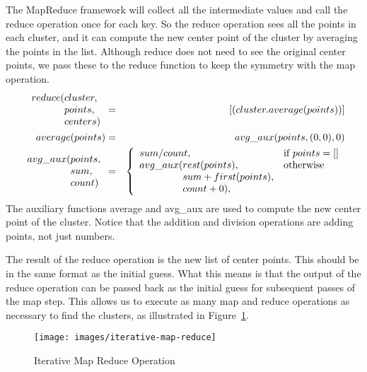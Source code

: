 The MapReduce framework will collect all the intermediate values and call the reduce
operation once for each key.  So the reduce operation sees all the points in each
cluster, and it can compute the new center point of the cluster by averaging the points
in the list.  Although reduce does not need to see the original center points, we pass
these to the reduce function to keep the symmetry with the map operation.
\begin{eqnarray*}
    \begin{array}{l@{}l}
        reduce(&cluster, \\
               &points, \\
               &centers)
    \end{array} &=& [ ( cluster . average(points) ) ] \\
average(points) &=& avg\_aux(points, (0,0), 0) \\
\begin{array}{l@{}l}
    avg\_aux(&points, \\
                 &sum, \\
                 &count)
\end{array} &=&
    \left\{
        \begin{array}{l@{}ll}
            \multicolumn{2}{l}{sum / count,}  & \mbox{if } points = [] \\
            avg\_aux(& rest(points),          & \mbox{otherwise} \\
                     & sum+first(points),     & \\
                     & count+0),              & \\
        \end{array}
    \right.
\end{eqnarray*}
The auxiliary functions average and avg\_aux are used to compute the new center point
of the cluster.  Notice that the addition and division operations are adding points,
not just numbers.

The result of the reduce operation is the new list of center points.  This should be
in the same format as the initial guess.  What this means is that the output of the
reduce operation can be passed back as the initial guess for subsequent passes of the
map step.  This allows us to execute as many map and reduce operations as necessary
to find the clusters, as illustrated in Figure~\ref{iterative-map-reduce}.

\begin{figure}
    \begin{center}
        \texttt{[image: images/iterative-map-reduce]}
    \end{center}
    \caption{Iterative Map Reduce Operation}
    \label{iterative-map-reduce}
\end{figure}

